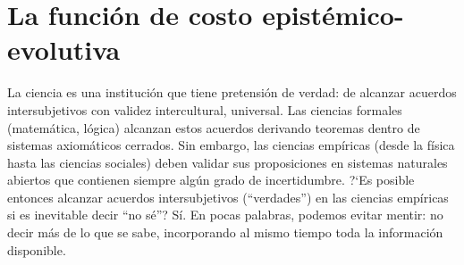 \documentclass[a4paper,11pt]{book}
\theoremstyle{definition}
\begin{document}
\section{La funci\'on de costo epist\'emico-evolutiva}

La ciencia es una instituci\'on que tiene pretensi\'on de verdad: de alcanzar acuerdos intersubjetivos con validez intercultural, universal.
%
Las ciencias formales (matem\'atica, l\'ogica) alcanzan estos acuerdos derivando teoremas dentro de sistemas axiom\'aticos cerrados.
%
Sin embargo, las ciencias emp\'iricas (desde la f\'isica hasta las ciencias sociales) deben validar sus proposiciones en sistemas naturales abiertos que contienen siempre alg\'un grado de incertidumbre.
%
?`Es posible entonces alcanzar acuerdos intersubjetivos (``verdades'') en las ciencias emp\'iricas si es inevitable decir ``no s\'e''?
%
S\'i.
%
En pocas palabras, podemos evitar mentir: no decir m\'as de lo que se sabe, incorporando al mismo tiempo toda la informaci\'on disponible.

\end{document}
